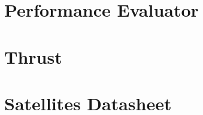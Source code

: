 \section{Performance Evaluator}
\label{PerformanceEvaluator}


\section{Thrust}
\label{Thrust}



\section{Satellites Datasheet}
\label{SatsDatashhet}

